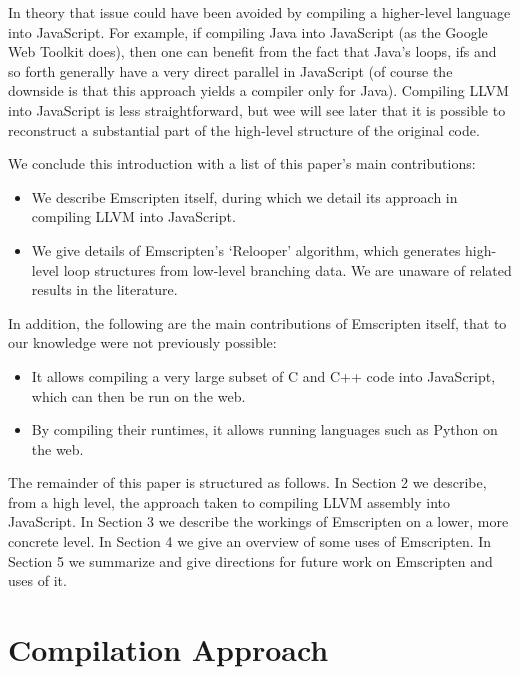 \documentclass[11pt]{proc}
\begin{document}
In theory that issue could have been avoided by compiling a higher-level
language into JavaScript. For example, if compiling Java into JavaScript
(as the Google Web Toolkit does), then one can benefit from the fact
that Java's loops, ifs and so forth generally have a very direct parallel
in JavaScript (of course the downside is that this approach yields a
compiler only for Java). Compiling LLVM into JavaScript is less straightforward,
but wee will see later that it is possible to reconstruct
a substantial part of the high-level structure of the original code.

We conclude this introduction with a list of this paper's main contributions:
\begin{itemize}
\item We describe Emscripten itself, during
      which we detail its approach in compiling LLVM into JavaScript.
\item We give details of Emscripten's `Relooper' algorithm, which generates
      high-level loop structures from low-level branching data. We are
      unaware of related results in the literature.
\end{itemize}
In addition, the following are the main contributions of Emscripten
itself, that to our knowledge were not previously possible:
\begin{itemize}
\item It allows compiling a very large subset of C and C++ code into
      JavaScript, which can then be run on the web.
\item By compiling their runtimes, it allows running languages such as Python
      on the web.
\end{itemize}

The remainder of this paper is structured as follows. In Section 2 we
describe, from a high level, the approach taken to compiling LLVM assembly into JavaScript.
In Section 3 we describe the workings of Emscripten on a lower, more
concrete level. In Section 4 we give an overview of some uses of
Emscripten. In Section 5 we summarize and give directions for future
work on Emscripten and uses of it.

\section{Compilation Approach}
\end{document}
